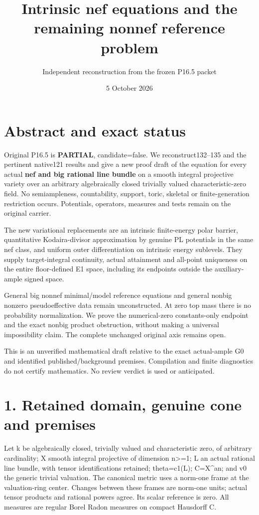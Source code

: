 \documentclass[
  10pt,
]{article}
\title{Intrinsic nef equations and the remaining nonnef reference
problem}
\author{Independent reconstruction from the frozen P16.5 packet}
\date{5 October 2026}
\begin{document}
\maketitle

\section{Abstract and exact status}\label{abstract-and-exact-status}

Original P16.5 is \textbf{PARTIAL}, candidate=false. We
reconstruct132--135 and the pertinent native121 results and give a new
proof draft of the equation for every actual \textbf{nef and big
rational line bundle} on a smooth integral projective variety over an
arbitrary algebraically closed trivially valued characteristic-zero
field. No semiampleness, countability, support, toric, skeletal or
finite-generation restriction occurs. Potentials, operators, measures
and tests remain on the original carrier.

The new variational replacements are an intrinsic finite-energy polar
barrier, quantitative Kodaira-divisor approximation by genuine PL
potentials in the same nef class, and uniform outer differentiation on
intrinsic energy sublevels. They supply target-integral continuity,
actual attainment and all-point uniqueness on the entire floor-defined
E1 space, including its endpoints outside the auxiliary-ample signed
space.

General big nonnef minimal/model reference equations and general nonbig
nonzero pseudoeffective data remain unconstructed. At zero top mass
there is no probability normalization. We prove the numerical-zero
constants-only endpoint and the exact nonbig product obstruction,
without making a universal impossibility claim. The complete unchanged
original axis remains open.

This is an unverified mathematical draft relative to the exact
actual-ample G0 and identified published/background premises.
Compilation and finite diagnostics do not certify mathematics. No review
verdict is used or anticipated.

\section{1. Retained domain, genuine cone and
premises}\label{retained-domain-genuine-cone-and-premises}

Let k be algebraically closed, trivially valued and characteristic zero,
of arbitrary cardinality; X smooth integral projective of dimension
n\textgreater=1; L an actual rational line bundle, with tensor
identifications retained; theta=c1(L); C=X\^{}an; and v0 the generic
trivial valuation. The canonical metric uses a norm-one frame at the
valuation-ring center. Changes between these frames are norm-one units;
actual tensor products and rational powers agree. Its scalar reference
is zero. All measures are regular Borel Radon measures on compact
Hausdorff C.
\end{document}
